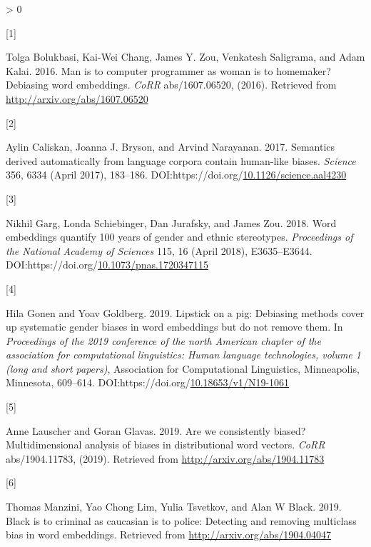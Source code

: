 \documentclass[
  10pt,
  dvipsnames,enabledeprecatedfontcommands, twocolumn]{scrartcl}
\newlength{\cslhangindent}
\newlength{\csllabelwidth}
\newenvironment{CSLReferences}[2] %
 {%
  \setlength{\parindent}{0pt}
  \ifodd #1 \everypar{\setlength{\hangindent}{\cslhangindent}}\ignorespaces\fi
  \ifnum #2 > 0
  \setlength{\parskip}{#2\baselineskip}
  \fi
 }%
 {}
\newcommand{\CSLLeftMargin}[1]{\parbox[t]{\csllabelwidth}{#1}}
\newcommand{\CSLRightInline}[1]{\parbox[t]{\linewidth - \csllabelwidth}{#1}\break}
\begin{document}
\hypertarget{refs}{}
\begin{CSLReferences}{0}{0}
\leavevmode\hypertarget{ref-Bolukbasi2016man}{}%
\CSLLeftMargin{{[}1{]} }
\CSLRightInline{Tolga Bolukbasi, Kai-Wei Chang, James Y. Zou, Venkatesh
Saligrama, and Adam Kalai. 2016. Man is to computer programmer as woman
is to homemaker? Debiasing word embeddings. \emph{CoRR} abs/1607.06520,
(2016). Retrieved from \url{http://arxiv.org/abs/1607.06520}}

\leavevmode\hypertarget{ref-Caliskan2017semanticsBiases}{}%
\CSLLeftMargin{{[}2{]} }
\CSLRightInline{Aylin Caliskan, Joanna J. Bryson, and Arvind Narayanan.
2017. Semantics derived automatically from language corpora contain
human-like biases. \emph{Science} 356, 6334 (April 2017), 183--186.
DOI:https://doi.org/\href{https://doi.org/10.1126/science.aal4230}{10.1126/science.aal4230}}

\leavevmode\hypertarget{ref-Garg2018years}{}%
\CSLLeftMargin{{[}3{]} }
\CSLRightInline{Nikhil Garg, Londa Schiebinger, Dan Jurafsky, and James
Zou. 2018. Word embeddings quantify 100 years of gender and ethnic
stereotypes. \emph{Proceedings of the National Academy of Sciences} 115,
16 (April 2018), E3635--E3644.
DOI:https://doi.org/\href{https://doi.org/10.1073/pnas.1720347115}{10.1073/pnas.1720347115}}

\leavevmode\hypertarget{ref-Gonen2019lipstick}{}%
\CSLLeftMargin{{[}4{]} }
\CSLRightInline{Hila Gonen and Yoav Goldberg. 2019. Lipstick on a pig:
{D}ebiasing methods cover up systematic gender biases in word embeddings
but do not remove them. In \emph{Proceedings of the 2019 conference of
the north {A}merican chapter of the association for computational
linguistics: Human language technologies, volume 1 (long and short
papers)}, Association for Computational Linguistics, Minneapolis,
Minnesota, 609--614.
DOI:https://doi.org/\href{https://doi.org/10.18653/v1/N19-1061}{10.18653/v1/N19-1061}}

\leavevmode\hypertarget{ref-Lauscher2019multidimensional}{}%
\CSLLeftMargin{{[}5{]} }
\CSLRightInline{Anne Lauscher and Goran Glavas. 2019. Are we
consistently biased? Multidimensional analysis of biases in
distributional word vectors. \emph{CoRR} abs/1904.11783, (2019).
Retrieved from \url{http://arxiv.org/abs/1904.11783}}

\leavevmode\hypertarget{ref-Manzini2019blackToCriminal}{}%
\CSLLeftMargin{{[}6{]} }
\CSLRightInline{Thomas Manzini, Yao Chong Lim, Yulia Tsvetkov, and Alan
W Black. 2019. Black is to criminal as caucasian is to police: Detecting
and removing multiclass bias in word embeddings. Retrieved from
\url{http://arxiv.org/abs/1904.04047}}


\end{CSLReferences}
\end{document}
